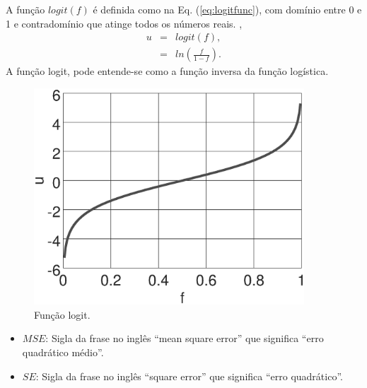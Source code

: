 \noindent
\begin{minipage}{0.55\textwidth}
\begin{definition}\label{def:logitfunc}
A função $logit(f)$ é definida como na Eq. (\ref{eq:logitfunc}), 
com domínio entre 0 e 1 e 
contradomínio que atinge todos os números reais. \cite[pp. 17]{kleinbaum2010logistic},
\begin{equation}\label{eq:logitfunc}
\begin{matrix}
u & = & logit(f),\\
~ & = & ln\left( \frac{f}{1-f}\right).
\end{matrix}
\end{equation}
A função logit, pode entende-se como a função inversa da função logística.
\end{definition}
\end{minipage}
\begin{minipage}{0.45\textwidth}
     \begin{figure}[H]
         \centering
         \includegraphics[width=0.9\textwidth]{chapters/classificacao/mfiles/logisticfunc/logit.eps}
         \caption{Função logit. }
         \label{fig:logitfunc}
     \end{figure}
\end{minipage}
\begin{tcbattention}
\begin{itemize}
\item $MSE$: Sigla da frase no inglês ``mean square error'' que significa ``erro quadrático médio''.
\item $SE$: Sigla da frase no inglês ``square error'' que significa ``erro quadrático''.
\end{itemize}
\end{tcbattention}
